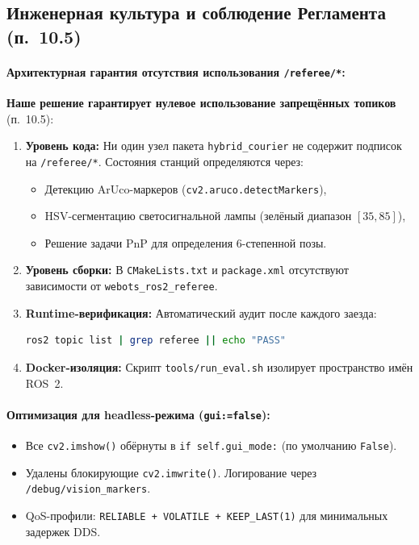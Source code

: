 \documentclass[a4paper,11pt]{article}
\begin{document}


\subsection{Инженерная культура и соблюдение Регламента (п.~10.5)}

\paragraph{Архитектурная гарантия отсутствия использования \texttt{/referee/*}:}

\textbf{Наше решение гарантирует нулевое использование запрещённых топиков} (п.~10.5):
\begin{enumerate}[leftmargin=*,nosep]
    \item \textbf{Уровень кода:} Ни один узел пакета \texttt{hybrid\_courier} не содержит подписок на \texttt{/referee/*}. Состояния станций определяются через:
    \begin{itemize}[nosep]
        \item Детекцию ArUco-маркеров (\texttt{cv2.aruco.detectMarkers}),
        \item HSV-сегментацию светосигнальной лампы (зелёный диапазон $[35, 85]$),
        \item Решение задачи PnP для определения 6-степенной позы.
    \end{itemize}
    \item \textbf{Уровень сборки:} В \texttt{CMakeLists.txt} и \texttt{package.xml} отсутствуют зависимости от \texttt{webots\_ros2\_referee}.
    \item \textbf{Runtime-верификация:} Автоматический аудит после каждого заезда:
    \begin{lstlisting}[language=bash,basicstyle=\ttfamily\tiny]
ros2 topic list | grep referee || echo "PASS"
    \end{lstlisting}
    \item \textbf{Docker-изоляция:} Скрипт \texttt{tools/run\_eval.sh} изолирует пространство имён ROS~2.
\end{enumerate}

\paragraph{Оптимизация для headless-режима (\texttt{gui:=false}):}
\begin{itemize}[leftmargin=*,nosep]
    \item Все \texttt{cv2.imshow()} обёрнуты в \texttt{if self.gui\_mode:} (по умолчанию \texttt{False}).
    \item Удалены блокирующие \texttt{cv2.imwrite()}. Логирование через \texttt{/debug/vision\_markers}.
    \item QoS-профили: \texttt{RELIABLE + VOLATILE + KEEP\_LAST(1)} для минимальных задержек DDS.
\end{itemize}
\end{document}
